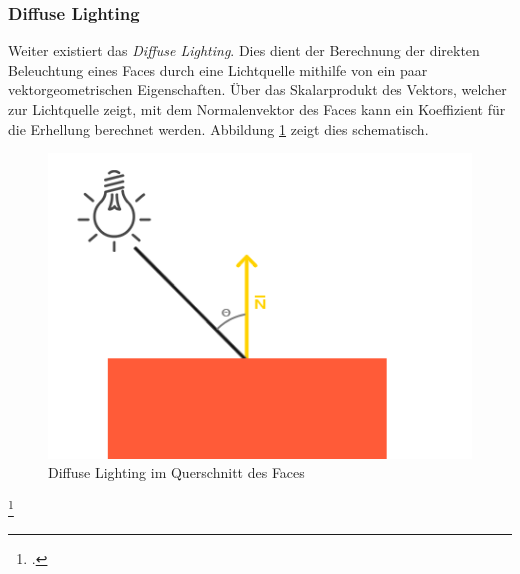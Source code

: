 \documentclass[titlepage, 11pt, a4paper, ngerman]{article}
\begin{document}
\subsubsection{Diffuse Lighting}
Weiter existiert das \textit{Diffuse Lighting}. Dies dient der Berechnung der direkten Beleuchtung eines \glspl{Face} durch eine Lichtquelle mithilfe von ein paar vektorgeometrischen Eigenschaften. Über das Skalarprodukt des Vektors, welcher zur Lichtquelle zeigt, mit dem Normalenvektor des \glspl{Face} kann ein Koeffizient für die Erhellung berechnet werden. Abbildung \ref{fig:diffuse} zeigt dies schematisch.
\begin{figure}[ht]
    \centering
    \includegraphics[scale=0.35]{res/diffuse_light.png}
    \caption[Diffuse Lighting im Querschnitt des \glspl{Face}]{Diffuse Lighting im Querschnitt des \glspl{Face}\footnotemark}
    \label{fig:diffuse}
\end{figure}
\footcitetext{logl-lighting}
\end{document}
